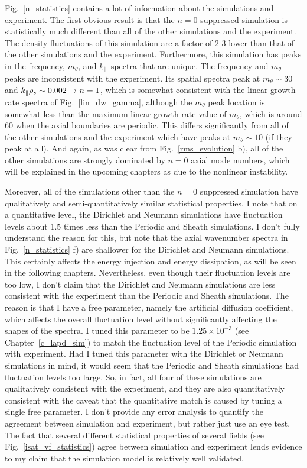 Fig.~\ref{n_statistics} contains a lot of information about the simulations and experiment. The first obvious result is that the $n=0$ suppressed simulation is statistically much different
than all of the other simulations and the experiment. The density fluctuations of this simulation are a factor of 2-3 lower than that of the other simulations and the experiment.
Furthermore, this simulation has peaks in the frequency, $m_\theta$, and $k_\parallel$ spectra that are unique. The frequency and $m_\theta$ peaks are inconsistent with the experiment. 
Its spatial spectra peak at
$m_\theta \sim 30$ and $k_\parallel \rho_s \sim 0.002 \rightarrow n = 1$, which is somewhat consistent with the linear growth rate spectra of Fig.~\ref{lin_dw_gamma}, although the $m_\theta$
peak location is somewhat less than the maximum linear growth rate value of $m_\theta$, which is around 60 when the axial boundaries are periodic. 
This differs significantly from all of the other simulations and the experiment which have peaks at $m_\theta \sim 10$ (if they peak at all).
And again, as was clear from Fig.~\ref{rms_evolution} b), all of the other simulations are strongly dominated by $n=0$ axial mode numbers, which will be explained
in the upcoming chapters as due to the nonlinear instability.

Moreover, all of the simulations other than the $n=0$ suppressed simulation have qualitatively and semi-quantitatively similar statistical properties. I note that on a quantitative level,
the Dirichlet and Neumann simulations have fluctuation levels about 1.5 times less than the Periodic and Sheath simulations. I don't fully understand the reason for this, but note
that the axial wavenumber spectra in Fig.~\ref{n_statistics} f) are shallower for the Dirichlet and Neumann simulations. This certainly affects the energy injection and energy
dissipation, as will be seen in the following chapters. Nevertheless, even though their fluctuation levels are too low,
I don't claim that the Dirichlet and Neumann simulations are less consistent with the experiment than the
Periodic and Sheath simulations. The reason is that I have a free parameter, namely the artificial
diffusion coefficient, which affects the overall fluctuation level without significantly affecting the shapes of the spectra. I tuned this parameter to be 
$1.25 \times 10^{-3}$ (see Chapter~\ref{c_lapd_sim})
to match the fluctuation level of the Periodic simulation with experiment. Had I tuned this parameter with the Dirichlet or Neumann simulations in mind, it would seem that
the Periodic and Sheath simulations had fluctuation levels too large. So, in fact, all four of these simulations are qualitatively consistent with the experiment, and they are also
quantitatively consistent with the caveat that the quantitative match is caused by tuning a single free parameter. I don't provide any error analysis to quantify the agreement
between simulation and experiment, but rather just use an eye test. The fact that several different statistical properties of several fields (see Fig.~\ref{isat_vf_statistics})
agree between simulation and experiment lends evidence to my claim that the simulation model is relatively well validated.


